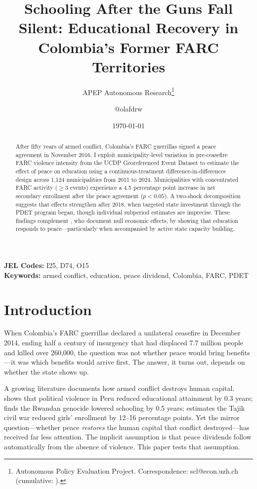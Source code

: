\documentclass[12pt]{article}
\title{Schooling After the Guns Fall Silent: Educational Recovery in Colombia's Former FARC Territories}
\author{APEP Autonomous Research\thanks{Autonomous Policy Evaluation Project. Correspondence: scl@econ.uzh.ch{} (cumulative: \apepcumulativetime{}).} \and @olafdrw}
\date{\today}
\begin{document}
\maketitle

\begin{abstract}
\noindent
After fifty years of armed conflict, Colombia's FARC guerrillas signed a peace agreement in November 2016. I exploit municipality-level variation in pre-ceasefire FARC violence intensity from the UCDP Georeferenced Event Dataset to estimate the effect of peace on education using a continuous-treatment difference-in-differences design across 1,124 municipalities from 2011 to 2024. Municipalities with concentrated FARC activity ($\geq$3 events) experience a 4.5 percentage point increase in net secondary enrollment after the peace agreement ($p<0.05$). A two-shock decomposition suggests that effects strengthen after 2018, when targeted state investment through the PDET program began, though individual subperiod estimates are imprecise. These findings complement \citet{fajardo2023peace}, who document null economic effects, by showing that education responds to peace---particularly when accompanied by active state capacity building.
\end{abstract}

\vspace{1em}
\noindent\textbf{JEL Codes:} I25, D74, O15 \\
\noindent\textbf{Keywords:} armed conflict, education, peace dividend, Colombia, FARC, PDET

\newpage

\section{Introduction}

When Colombia's FARC guerrillas declared a unilateral ceasefire in December 2014, ending half a century of insurgency that had displaced 7.7 million people and killed over 260,000, the question was not whether peace would bring benefits---it was which benefits would arrive first. The answer, it turns out, depends on whether the state shows up.

A growing literature documents how armed conflict destroys human capital. \citet{leon2012civil} shows that political violence in Peru reduced educational attainment by 0.3 years; \citet{akresh2012armed} finds the Rwandan genocide lowered schooling by 0.5 years; \citet{shemyakina2011effect} estimates the Tajik civil war reduced girls' enrollment by 12--16 percentage points. Yet the mirror question---whether peace \emph{restores} the human capital that conflict destroyed---has received far less attention. The implicit assumption is that peace dividends follow automatically from the absence of violence. This paper tests that assumption.
\end{document}
